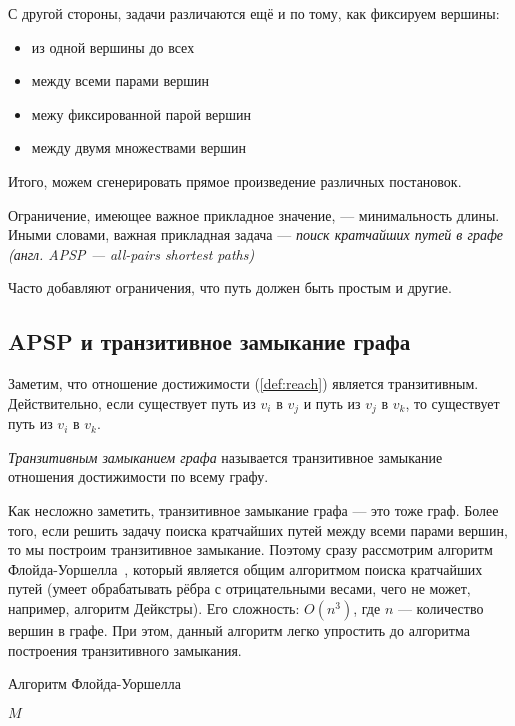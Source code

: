С другой стороны, задачи различаются ещё и по тому, как фиксируем вершины:
\begin{itemize}
\item из одной вершины до всех
\item между всеми парами вершин
\item межу фиксированной парой вершин
\item между двумя множествами вершин
\end{itemize}

Итого, можем сгенерировать прямое произведение различных постановок.

Ограничение, имеющее важное прикладное значение, --- минимальность длины. 
Иными словами, важная прикладная задача --- \textit{поиск кратчайших путей в графе (англ. APSP --- all-pairs shortest paths)}

Часто добавляют ограничения, что путь должен быть простым и другие.

\subsection{APSP и транзитивное замыкание графа}

Заметим, что отношение достижимости (\ref{def:reach}) является транзитивным.
Действительно, если существует путь из $v_i$ в $v_j$ и путь из $v_j$ в $v_k$, то существует путь из $v_i$ в $v_k$.

\begin{definition}
  \textit{Транзитивным замыканием графа} называется транзитивное замыкание отношения достижимости по всему графу.
\end{definition}

Как несложно заметить, транзитивное замыкание графа --- это тоже граф.
Более того, если решить задачу поиска кратчайших путей между всеми парами вершин, то мы построим транзитивное замыкание.
Поэтому сразу рассмотрим алгоритм Флойда-Уоршелла~\cite{Floyd1962, Bernard1959, Warshall1962}, который является общим алгоритмом поиска кратчайших путей (умеет обрабатывать рёбра с отрицательными весами, чего не может, например, алгоритм Дейкстры). Его сложность: $O(n^3)$, где $n$ --- количество вершин в графе.
При этом, данный алгоритм легко упростить до алгоритма построения транзитивного замыкания.

\begin{algorithm}
\begin{algorithmic}[1]
\caption{Алгоритм Флойда-Уоршелла}
\label{lst:algoFloydWarxhall}
        \EndFor
      \EndFor
    \EndFor
\State \Return $M$
\EndFunction
\end{algorithmic}
\end{algorithm}


